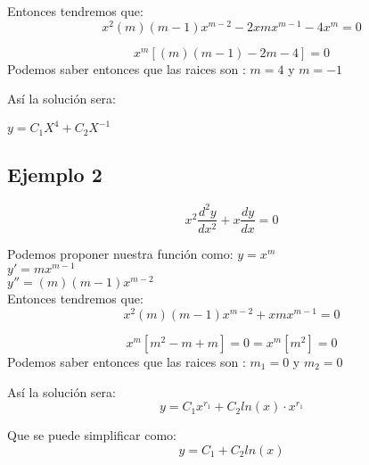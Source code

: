 \documentclass[12pt]{report}                               %
\begin{document}
        Entonces tendremos que:
        \begin{equation*}
            x^2 (m)(m-1)x^{m-2} - 2x mx^{m-1} - 4x^m = 0
        \end{equation*}

        \begin{equation*}
            x^m [(m)(m-1)-  2m -4] = 0
        \end{equation*}
        Podemos saber entonces que las raices son : $ m = 4$ y $m = -1$

        Así la solución sera:

        $y = C_1X^4 + C_2 X^{-1}$

        \subsection{Ejemplo 2}
        \begin{equation*}
            x^2 \frac{d^2 y}{dx^2} + x \frac{dy}{dx} = 0
        \end{equation*}

        Podemos proponer nuestra función como:
        $y = x^m$\\
        $y' = mx^{m-1}$\\
        $y'' = (m)(m-1)x^{m-2}$\\

        Entonces tendremos que:
        \begin{equation*}
            x^2 (m)(m-1)x^{m-2} + x mx^{m-1} = 0
        \end{equation*}

        \begin{equation*}
            x^m [m^2 - m + m] = 0 = x^m [m^2] = 0
        \end{equation*}
        Podemos saber entonces que las raices son : $ m_1 = 0$ y $m_2 = 0$

        Así la solución sera:
        \begin{equation*}
            y = C_1 x ^{r_1} + C_2 ln(x) \cdot x^{r_1}
        \end{equation*}

        Que se puede simplificar como:
        \begin{equation*}
            y = C_1 + C_2 ln(x)
        \end{equation*}

\end{document}
